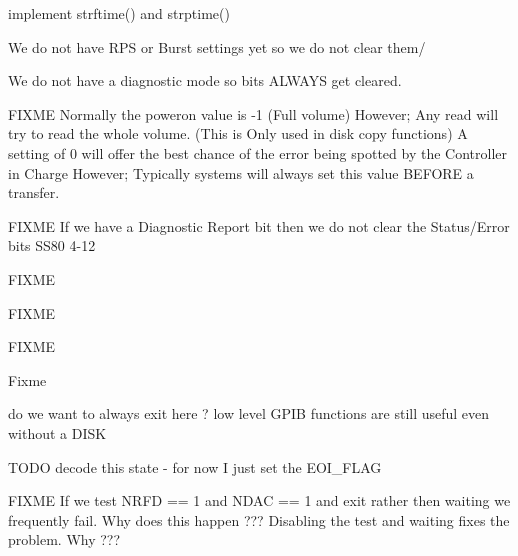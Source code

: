 
\begin{DoxyRefList}
\item[\label{todo__todo000001}%
\hypertarget{todo__todo000001}{}%
Global \hyperlink{time_8h_a7ffc52def0c7fbf70c50248e3f7d6a8a}{asctime\+\_\+r} (tm\+\_\+t $\ast$t, char $\ast$buf)]implement strftime() and strptime()  
\item[\label{todo__todo000045}%
\hypertarget{todo__todo000045}{}%
Global \hyperlink{ss80_8h_aa48ccb1479e226dacfaa1dac15631a9d}{Clear\+\_\+\+Common} (int u)]We do not have R\+PS or Burst settings yet so we do not clear them/ 

We do not have a diagnostic mode so bits A\+L\+W\+A\+YS get cleared. 

F\+I\+X\+ME Normally the poweron value is -\/1 (Full volume) However; Any read will try to read the whole volume. (This is Only used in disk copy functions) A setting of 0 will offer the best chance of the error being spotted by the Controller in Charge However; Typically systems will always set this value B\+E\+F\+O\+RE a transfer. 

F\+I\+X\+ME If we have a Diagnostic Report bit then we do not clear the Status/\+Error bits S\+S80 4-\/12  
\item[\label{todo__todo000052}%
\hypertarget{todo__todo000052}{}%
Global \hyperlink{fatfs__utils_8h_a97a2409a53057e1a63537f196ff00a50}{fatfs\+\_\+cat} (char $\ast$name)]F\+I\+X\+ME  
\item[\label{todo__todo000006}%
\hypertarget{todo__todo000006}{}%
Global \hyperlink{gpib__task_8h_ac63d4e431ab55dddfbf436d87135128e}{G\+P\+IB} (uint8\+\_\+t ch)]F\+I\+X\+ME 

F\+I\+X\+ME 

Fixme  
\item[\label{todo__todo000005}%
\hypertarget{todo__todo000005}{}%
Global \hyperlink{gpib__task_8h_a903eb44d83bf8f2db71e6f32a35fec62}{gpib\+\_\+error\+\_\+test} (uint16\+\_\+t val)]do we want to always exit here ? low level G\+P\+IB functions are still useful even without a D\+I\+SK  
\item[\label{todo__todo000004}%
\hypertarget{todo__todo000004}{}%
Global \hyperlink{gpib_8h_a67f7cdca85091b3eb0eea0051a200fbe}{gpib\+\_\+read\+\_\+str} (uint8\+\_\+t $\ast$buf, int size, uint16\+\_\+t $\ast$status)]T\+O\+DO decode this state -\/ for now I just set the E\+O\+I\+\_\+\+F\+L\+AG  
\item[\label{todo__todo000002}%
\hypertarget{todo__todo000002}{}%
Global \hyperlink{gpib_8h_ac3d50cc1d56705d107e2f8fb00692e68}{gpib\+\_\+write\+\_\+byte} (uint16\+\_\+t ch)]F\+I\+X\+ME If we test N\+R\+FD == 1 and N\+D\+AC == 1 and exit rather then waiting we frequently fail. Why does this happen ??? Disabling the test and waiting fixes the problem. Why ??? 


\end{DoxyRefList}
